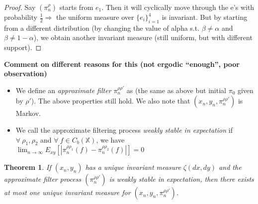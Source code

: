 \documentclass{article}
\newtheorem{theorem}{Theorem}[section]
\begin{document}
\begin{proof}
    Say \((\pi^\rho_n)\) starts from \(e_1\). Then it will cyclically move through the e's with probability \(\frac{1}{2} \Rightarrow\) the uniform measure over \(\{e_i\}_{i=1}^4\) is invariant.
    But by starting from a different distribution (by changing the value of alpha s.t. \(\beta \neq \alpha\) and \(\beta \neq 1-\alpha\)), we obtain another invariant measure (still uniform, but with different support).
\end{proof}

\textbf{Comment on different reasons for this (not ergodic ``enough'', poor observation)}

\begin{itemize}
    \item We define an \emph{approximate filter} \(\pi_n^{\rho\rho'}\) as (the same as above but initial \(\pi_0\) given by \(\rho'\)). The above properties still hold. We also note that \((x_n,y_n,\pi^{\rho\rho'}_n)\) is Markov.
    \item We call the approximate filtering process \emph{weakly stable in expectation} if \(\forall \: \rho_1, \rho_2\) and \(\forall \: f \in C_b(\mathbb{X})\), we have \(\lim_{n\to\infty}E_{xy}[|\pi_n^{\rho\rho_1}(f) - \pi_n^{\rho\rho_2}(f)|] = 0\)
\end{itemize}

\begin{theorem}
    If \((x_n,y_n)\) has a unique invariant measure \( \zeta(dx,dy) \) and the approximate filter process \((\pi_n^{\rho\rho'})\) is weakly stable in expectation, then there exists at most one unique invariant measure for \((x_n,y_n,\pi^{\rho\rho'}_n)\).
\end{theorem}
\end{document}
